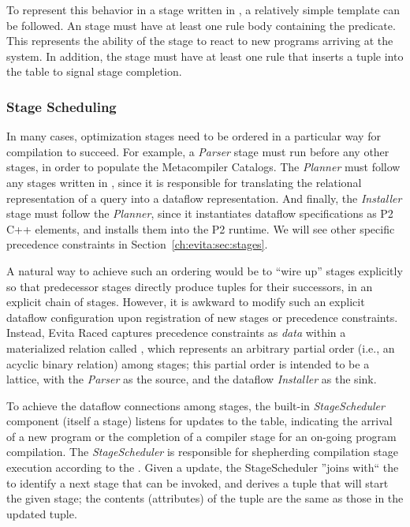 To represent this behavior in a stage written in \OVERLOG, a relatively simple
template can be followed.  An \OVERLOG stage must have at least one rule body
containing the  predicate.  This represents the
ability of the stage to react to new programs arriving at the system.  In
addition, the stage must have at least one rule that inserts a 
tuple into the  table to signal stage completion.

\subsubsection{Stage Scheduling}
\label{ch:evita:sec:stageschedule}

In many cases, optimization stages need to be ordered in a particular way for
compilation to succeed.  For example, a {\em Parser} stage must run before any
other stages, in order to populate the Metacompiler Catalogs.  The {\em
Planner} must follow any stages written in \OVERLOG, since it is responsible
for translating the relational representation of a query into a dataflow
representation.  And finally, the {\em Installer} stage must follow the {\em
Planner}, since it instantiates dataflow specifications as P2 C++ elements, and
installs them into the P2 runtime.  We will see other specific precedence
constraints in Section~\ref{ch:evita:sec:stages}.

A natural way to achieve such an ordering would be to ``wire up'' stages
explicitly so that predecessor stages directly produce
 tuples for their successors, in an explicit chain of
stages.  However, it is awkward to modify such an explicit dataflow
configuration upon registration of new stages or precedence constraints.
Instead, Evita Raced captures precedence constraints as {\em data} within a
materialized relation called , which represents an arbitrary
partial order (i.e., an acyclic binary relation) among stages; this partial
order is intended to be a lattice, with the {\em Parser} as the source, and the
dataflow {\em Installer} as the sink.  
 
To achieve the dataflow connections among stages, the built-in {\em
StageScheduler} component (itself a stage) listens for updates to the
 table, indicating the arrival of a new \OVERLOG program or the
completion of a compiler stage for an on-going program compilation.  The {\em
StageScheduler} is responsible for shepherding compilation stage execution
according to the .  Given a  update, the
StageScheduler ''joins with`` the  to identify a next stage
that can be invoked, and derives a  tuple that will
start the given stage; the contents (attributes) of the
 tuple are the same as those in the updated
 tuple.


